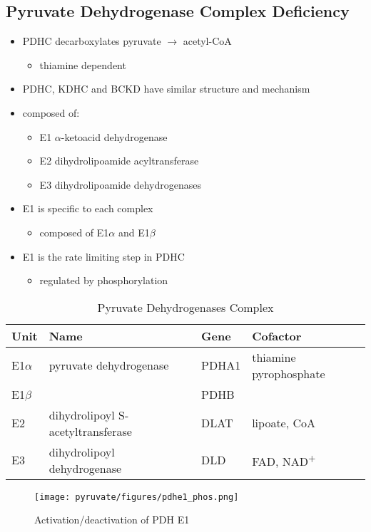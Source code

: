 \documentclass[12pt]{scrartcl}
\begin{document}
\subsection{Pyruvate Dehydrogenase Complex Deficiency}
\label{sec:orgcc52b61}
\begin{itemize}
\item PDHC decarboxylates pyruvate \(\to\) acetyl-CoA
\begin{itemize}
\item thiamine dependent
\end{itemize}
\item PDHC, KDHC and BCKD have similar structure and mechanism
\item composed of:
\begin{itemize}
\item E1 \(\alpha\)-ketoacid dehydrogenase
\item E2 dihydrolipoamide acyltransferase
\item E3 dihydrolipoamide dehydrogenases
\end{itemize}
\item E1 is specific to each complex
\begin{itemize}
\item composed of E1\(\alpha\) and E1\(\beta\)
\end{itemize}
\item E1 is the rate limiting step in PDHC
\begin{itemize}
\item regulated by phosphorylation
\end{itemize}
\end{itemize}

\begin{table}[htbp]
\caption{\label{tab:org55898a0}Pyruvate Dehydrogenases Complex}
\centering
\begin{tabular}{llll}
Unit & Name & Gene & Cofactor\\
\hline
E1\(\alpha\) & pyruvate dehydrogenase & PDHA1 & thiamine pyrophosphate\\
E1\(\beta\) &  & PDHB & \\
E2 & dihydrolipoyl  S-acetyltransferase & DLAT & lipoate, CoA\\
E3 & dihydrolipoyl dehydrogenase & DLD & FAD, NAD\textsuperscript{+}\\
\end{tabular}
\end{table}

\begin{figure}[htbp]
\centering
\texttt{[image: pyruvate/figures/pdhe1\_phos.png]}
\caption[pdhe1]{\label{fig:orge760e35}Activation/deactivation of PDH E1}
\end{figure}
\end{document}
